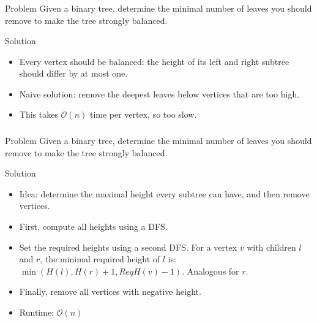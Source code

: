 \begin{frame}
    \frametitle{\problemtitle}
    \begin{block}{Problem}
        Given a binary tree, determine the minimal number of leaves you should remove to make the tree strongly balanced.
    \end{block}
    \pause
    \begin{block}{Solution}
        \begin{itemize}
            \item<+-> Every vertex should be balanced: the height of its left and right subtree should differ by at most one.
            \item<+-> Naive solution: remove the deepest leaves below vertices that are too high.
            \item<+-> This takes $\mathcal{O}(n)$ time per vertex, so too slow.
        \end{itemize}
    \end{block}
\end{frame}
\begin{frame}
    \frametitle{\problemtitle}
    \begin{block}{Problem}
        Given a binary tree, determine the minimal number of leaves you should remove to make the tree strongly balanced.
    \end{block}
    \begin{block}{Solution}
        \begin{itemize}
            \item<+-> Idea: determine the maximal height every subtree can have,
                and then remove vertices.
            \item<+-> First, compute all heights using a DFS.
            \item<+-> Set the required heights using a second DFS. For a vertex $v$ with children $l$ and $r$, the minimal required height of $l$ is: $\min(H(l),H(r)+1,ReqH(v)-1)$. Analogous for $r$.
            \item<+-> Finally, remove all vertices with negative height.
            \item<+-> Runtime: $\mathcal{O}(n)$
        \end{itemize}
    \end{block}
\end{frame}

